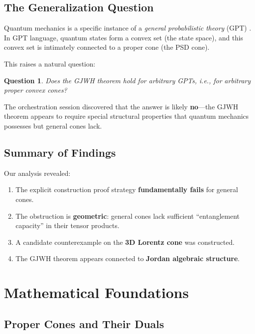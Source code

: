 \documentclass[11pt,a4paper]{article}
\newtheorem{question}[theorem]{Question}
\theoremstyle{definition}
\begin{document}
\subsection{The Generalization Question}

Quantum mechanics is a specific instance of a \emph{general probabilistic theory} (GPT) \cite{hardy2001quantum,barrett2007information}. In GPT language, quantum states form a convex set (the state space), and this convex set is intimately connected to a proper cone (the PSD cone).

This raises a natural question:

\begin{question}
Does the GJWH theorem hold for arbitrary GPTs, i.e., for arbitrary proper convex cones?
\end{question}

The orchestration session discovered that the answer is likely \textbf{no}---the GJWH theorem appears to require special structural properties that quantum mechanics possesses but general cones lack.

\subsection{Summary of Findings}

Our analysis revealed:

\begin{enumerate}
    \item The explicit construction proof strategy \textbf{fundamentally fails} for general cones.
    \item The obstruction is \textbf{geometric}: general cones lack sufficient ``entanglement capacity'' in their tensor products.
    \item A candidate counterexample on the \textbf{3D Lorentz cone} was constructed.
    \item The GJWH theorem appears connected to \textbf{Jordan algebraic structure}.
\end{enumerate}

\section{Mathematical Foundations}

\subsection{Proper Cones and Their Duals}
\end{document}
